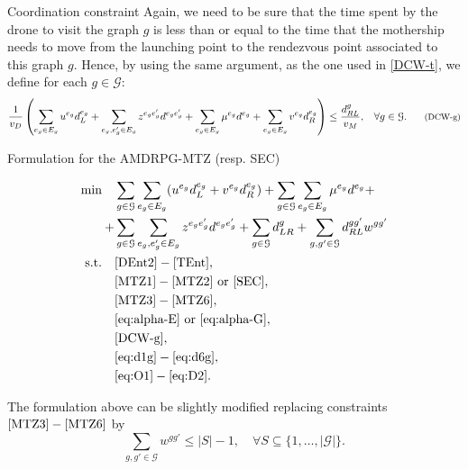 \documentclass[slidestop,usepdftitle=false,10pt]{beamer}
\begin{document}
	\begin{frame}{Coordination constraint}
	    Again, we need to be sure that the time spent by the drone to visit the graph $g$ is less than or equal to the time that the mothership needs to move from the launching point to the rendezvous point associated to this graph $g$. Hence, by using the same argument, as the one used in \eqref{DCW-t}, we define for each $g\in \mathcal G$:
        \begin{equation}
        \footnotesize
         \frac{1}{v_D}\left(\sum_{e_g\in E_g} u^{e_g}d_L^{e_g} + \sum_{e_g, e^\prime_g\in E_g}z^{e_ge^\prime_g}d^{e_ge^\prime_g} + \sum_{e_g\in E_g} \mu^{e_g} d^{e_g} + \sum_{e_g\in E_g}v^{e_g}d_R^{e_g}\right)\leq \frac{d_{RL}^{g}}{v_M}, \quad\forall g\in\mathcal G.\label{DCW-g}\tag{DCW-g}
        \end{equation}

	\end{frame}
	
	\begin{frame}{Formulation for the AMDRPG-MTZ (resp. SEC)}
	\begin{footnotesize}
	\begin{align*}
	    \text{min}\quad &\sum_{g\in\mathcal G}\sum_{e_g\in E_g} (u^{e_g}d_L^{e_g} + v^{e_g}d_R^{e_g}) + \sum_{g\in\mathcal G}\sum_{e_g\in E_g} \mu^{e_g} d^{e_g} + \\
	    + & \sum_{g\in\mathcal G}\sum_{e_g,e^\prime_g\in E_g}z^{e_ge^\prime_g}d^{e_ge^\prime_g} + \sum_{g\in\mathcal G} d_{LR}^g + \sum_{g,g'\in \mathcal G}d_{RL}^{gg'}w^{gg'} \\
	    \text{s.t.}\quad & \eqref{DEnt2}-\eqref{TEnt}, \\
	    & \eqref{MTZ1} - \eqref{MTZ2} \text{ or } \eqref{SEC}, \\
	    & \eqref{MTZ3} - \eqref{MTZ6}, \\
	    & \eqref{eq:alpha-E} \text{ or } \eqref{eq:alpha-G}, \\
	    & \eqref{DCW-g}, \\
	    & \eqref{eq:d1g}-\eqref{eq:d6g}, \\
	    & \eqref{eq:O1}-\eqref{eq:D2}.
	\end{align*}
	\end{footnotesize}
	The formulation above can be slightly modified replacing constraints $\eqref{MTZ3} - \eqref{MTZ6}$ by
    \begin{equation}\label{SEC-graph}
    \sum_{g,g'\in \mathcal G} w^{gg'} \le |S|-1, \quad \forall S\subseteq \{1,\ldots, |\mathcal G|\}.
    \end{equation}

	\end{frame}
	
\end{document}
